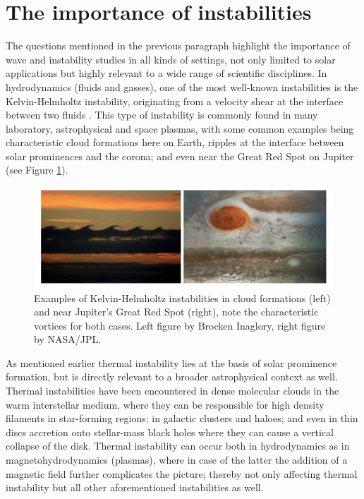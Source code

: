 \section{The importance of instabilities}
The questions mentioned in the previous paragraph highlight the importance of wave and instability studies in all kinds of settings, not only limited to solar applications but highly relevant to a wide range of scientific disciplines. In hydrodynamics (fluids and gasses), one of the most well-known instabilities is the Kelvin-Helmholtz instability, originating from a velocity shear at the interface between two fluids \citep{book_choudhuri}. This type of instability is commonly found in many laboratory, astrophysical and space plasmas, with some common examples being characteristic cloud formations here on Earth, ripples at the interface between solar prominences and the corona; and even near the Great Red Spot on Jupiter (see Figure \ref{fig: kh_instability}).

\begin{figure}[b]
  \centering
  \includegraphics[width=\textwidth]{instabilities.png}
  \caption{
    Examples of Kelvin-Helmholtz instabilities in cloud formations (left) and near Jupiter's Great Red Spot (right), note the characteristic vortices for both cases. Left figure by Brocken Inaglory, right figure by NASA/JPL.
  }
  \label{fig: kh_instability}
\end{figure}

As mentioned earlier thermal instability lies at the basis of solar prominence formation, but is directly relevant to a broader astrophysical context as well. Thermal instabilities have been encountered in dense molecular clouds in the warm interstellar medium, where they can be responsible for high density filaments in star-forming regions; in galactic clusters and haloes; and even in thin discs accretion onto stellar-mass black holes where they can cause a vertical collapse of the disk. Thermal instability can occur both in hydrodynamics as in magnetohydrodynamics (plasmas), where in case of the latter the addition of a magnetic field further complicates the picture; thereby not only affecting thermal instability but all other aforementioned instabilities as well.

